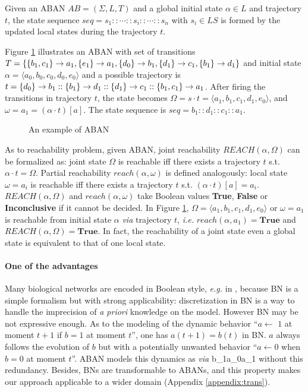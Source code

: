 \begin{definition}
Given an ABAN $AB = (\Sigma,L,T)$ and a global initial state $\alpha\in L$ and trajectory $t$, the state sequence $seq=s_1::\cdots :: s_i::\cdots ::s_n$ with $s_i\in LS$ is formed by the updated local states during the trajectory $t$.
\end{definition}

\begin{example}
    Figure \ref{exampleABAN} illustrates an ABAN with set of transitions $T=\{\acm{b_1,c_1}{a_0}{a_1},\acm{e_1}{a_0}{a_1},\acm{d_0}{b_0}{b_1},\acm{d_1}{c_0}{c_1},\acm{b_1}{d_0}{d_1}\}$ and initial state $\alpha=\langle a_0,b_0,c_0,d_0,e_0\rangle$ and a possible trajectory is $t=\acm{d_0}{b_0}{b_1}::\acm{b_1}{d_0}{d_1}::\acm{d_1}{c_0}{c_1}::\acm{b_1,c_1}{a_0}{a_1}$.
    After firing the transitions in trajectory $t$, the state becomes $\Omega=s\cdot t=\langle a_1,b_1,c_1,d_1,e_0\rangle$, and $\omega= a_1= (\alpha\cdot t)[a]$. The state sequence is $seq=b_1::d_1::c_1::a_1$.
\end{example}

\begin{figure}[ht]
\centering

\caption[Example of ABAN]{An example of ABAN}\label{exampleABAN}
\end{figure}

As to reachability problem, given ABAN, joint reachability $REACH (\alpha,\Omega)$ can be formalized as: joint state $\Omega$ is reachable iff there exists a trajectory $t$ s.t. $\alpha\cdot t=\Omega$.
Partial reachability $reach(\alpha,\omega)$ is defined analogously: local state $\omega=a_i$ is reachable iff there exists a trajectory $t$ s.t. $(\alpha\cdot t)[a]=a_i$.
$REACH (\alpha,\Omega)$ and $reach(\alpha,\omega)$ take Boolean values \textbf{True}, \textbf{False} or \textbf{Inconclusive} if it cannot be decided.
In Figure \ref{exampleABAN}, $\Omega=\langle a_1,b_1,c_1,d_1,e_0\rangle$ or $\omega=a_1$ is reachable from initial state $\alpha$ \textit{via} trajectory $t$, \textit{i.e.} $reach(\alpha,a_1)=\textbf{True}$ and $REACH(\alpha,\Omega)=\textbf{True}$. 
In fact, the reachability of a joint state even a global state is equivalent to that of one local state. 

\paragraph{\textbf{One of the advantages}}
Many biological networks are encoded in Boolean style, \textit{e.g.} in \cite{akutsu2007control,kauffman1969}, because BN is a simple formalism but with strong applicability: discretization in BN is a way to handle the imprecision of \textit{a priori} knowledge on the model.
However BN may be not expressive enough.
As to the modeling of the dynamic behavior ``$a\gets$ $1$ at moment $t+1$ if $b=1$ at moment $t$'', one has $a(t+1)=b(t)$ in BN.
$a$ always follows the evolution of $b$ but with a potentially unwanted behavior ``$a\gets 0$ when $b=0$ at moment $t$''.
ABAN models this dynamics as \textit{via} \ac{b_1}{a_0}{a_1} without this redundancy. 
Besides, BNs are transformable to ABANs, and this property makes our approach applicable to a wider domain (Appendix \ref{appendix:trans}).


